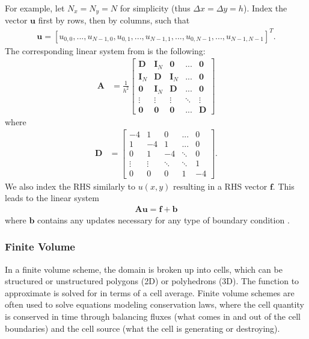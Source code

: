 For example, let $N_x = N_y = N$ for simplicity (thus $\Delta x = \Delta y = h$). Index the vector $\textbf{u}$ first by rows, then by columns, such that
\begin{align}
    \textbf{u} = [u_{0,0}, ..., u_{N - 1, 0}, u_{0, 1}, ..., u_{N - 1, 1}, ..., u_{0, N - 1}, ..., u_{N - 1, N - 1}]^T.
\end{align}
The corresponding linear system from  is the following:
\begin{align}
    \textbf{A} &= \frac{1}{h^2}
    \begin{bmatrix}
        \textbf{D} & \textbf{I}_{N} & \textbf{0} & ... & \textbf{0} \\
        \textbf{I}_{N} & \textbf{D} & \textbf{I}_{N} & ... & \textbf{0} \\
        \textbf{0} & \textbf{I}_{N} & \textbf{D} & ... & \textbf{0} \\
        \vdots & \vdots & \vdots & \ddots & \vdots \\
        \textbf{0} & \textbf{0} & \textbf{0} & ... & \textbf{D}
    \end{bmatrix}
\end{align}
where
\begin{align}
    \textbf{D} &= 
    \begin{bmatrix}
        -4 & 1 & 0 & ... & 0 \\
        1 & -4 & 1 & ... & 0 \\
        0 & 1 & -4 & \ddots & 0 \\
        \vdots & \vdots & \ddots & \ddots & 1 \\
        0 & 0 & 0 & 1 & -4
    \end{bmatrix}.
\end{align}
We also index the RHS similarly to $u(x,y)$ resulting in a RHS vector $\textbf{f}$. This leads to the linear system
\begin{align}
    \textbf{A} \textbf{u} = \textbf{f} + \textbf{b}
\end{align}
where $\textbf{b}$ contains any updates necessary for any type of boundary condition \citep{leveque2007finite}.

\subsubsection{Finite Volume}

In a finite volume scheme, the domain is broken up into cells, which can be structured or unstructured polygons (2D) or polyhedrons (3D). The function to approximate is solved for in terms of a cell average. Finite volume schemes are often used to solve equations modeling conservation laws, where the cell quantity is conserved in time through balancing fluxes (what comes in and out of the cell boundaries) and the cell source (what the cell is generating or destroying).

